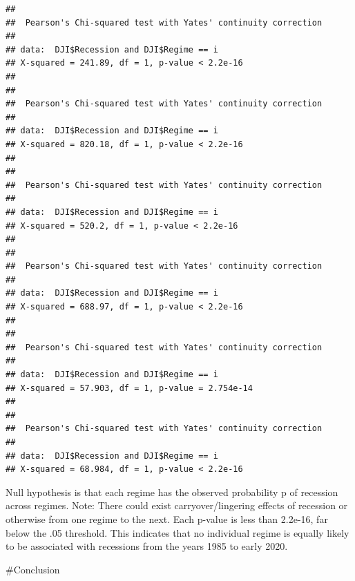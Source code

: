 \documentclass[]{article}
\begin{document}
\begin{verbatim}
## 
##  Pearson's Chi-squared test with Yates' continuity correction
## 
## data:  DJI$Recession and DJI$Regime == i
## X-squared = 241.89, df = 1, p-value < 2.2e-16
## 
## 
##  Pearson's Chi-squared test with Yates' continuity correction
## 
## data:  DJI$Recession and DJI$Regime == i
## X-squared = 820.18, df = 1, p-value < 2.2e-16
## 
## 
##  Pearson's Chi-squared test with Yates' continuity correction
## 
## data:  DJI$Recession and DJI$Regime == i
## X-squared = 520.2, df = 1, p-value < 2.2e-16
## 
## 
##  Pearson's Chi-squared test with Yates' continuity correction
## 
## data:  DJI$Recession and DJI$Regime == i
## X-squared = 688.97, df = 1, p-value < 2.2e-16
## 
## 
##  Pearson's Chi-squared test with Yates' continuity correction
## 
## data:  DJI$Recession and DJI$Regime == i
## X-squared = 57.903, df = 1, p-value = 2.754e-14
## 
## 
##  Pearson's Chi-squared test with Yates' continuity correction
## 
## data:  DJI$Recession and DJI$Regime == i
## X-squared = 68.984, df = 1, p-value < 2.2e-16
\end{verbatim}

Null hypothesis is that each regime has the observed probability p of
recession across regimes. Note: There could exist carryover/lingering
effects of recession or otherwise from one regime to the next. Each
p-value is less than 2.2e-16, far below the .05 threshold. This
indicates that no individual regime is equally likely to be associated
with recessions from the years 1985 to early 2020.

\#Conclusion
\end{document}
